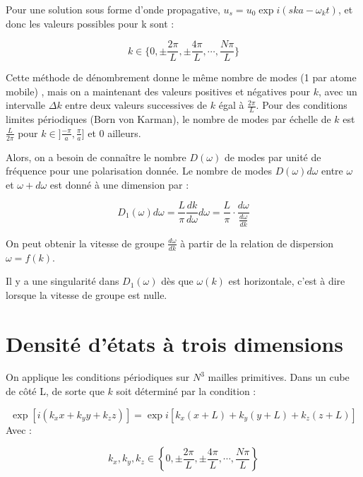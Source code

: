 Pour une solution sous forme d'onde propagative, $u_s = u_0 \exp i (ska - \omega_k t)$, et donc les valeurs possibles pour k sont :

\begin{equation}
    k\in \{ 0,\pm\frac{2\pi}{L}, \pm\frac{4\pi}{L},\cdots, \frac{N\pi}{L} \} 
\end{equation}

Cette méthode de dénombrement donne le même nombre de modes (1 par atome mobile)
, mais on a maintenant des valeurs positives et négatives pour $k$, avec un
intervalle $\Delta k$ entre deux valeurs successives de $k$ égal à
$\frac{2\pi}{L}$. Pour des conditions limites périodiques (Born von Karman), le
nombre de modes par échelle de $k$ est $\frac{L}{2\pi}$ pour
$k \in ]\frac{-\pi}{a},\frac{\pi}{a} ]$ et 0 ailleurs.

Alors, on a besoin de connaître le nombre $D(\omega)$ de modes par unité de
fréquence pour une polarisation donnée. Le nombre de modes $D(\omega)d\omega$
entre $\omega$ et $\omega + d\omega$ est donné à une dimension par :

\begin{equation}
    D_1(\omega) d\omega = \frac{L}{\pi} \frac{dk}{d\omega} d\omega = \frac{L}{\pi} \cdot \frac{d\omega}{\frac{d\omega}{dk}}
\end{equation}

On peut obtenir la vitesse de groupe $\frac{d\omega}{dk}$ à partir de la
relation de dispersion $\omega = f(k)$.

Il y a une singularité dans $D_1(\omega)$ dès que $\omega(k)$ est horizontale,
c'est à dire lorsque la vitesse de groupe est nulle.


\section{Densité d'états à trois dimensions}

On applique les conditions périodiques sur $N^3$ mailles primitives. Dans un
cube de côté L, de sorte que $k$ soit déterminé par la condition :

\begin{equation}
    \exp \left[ i(k_x x + k_y y + k_z z) \right] = \exp i \left[ k_x (x+L) + k_y (y+L) + k_z (z+L) \right]
\end{equation}
Avec :

\begin{equation}
    k_x,k_y,k_z \in \left\{ 0, \pm\frac{2\pi}{L}, \pm \frac{4\pi}{L}, \cdots,\frac{N\pi}{L} \right\}
\end{equation}

